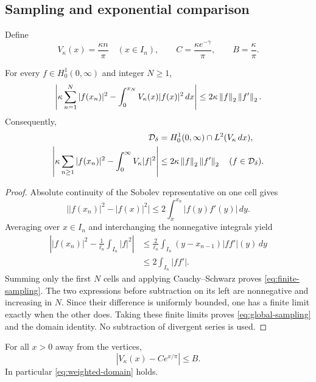 \subsection{Sampling and exponential comparison}

Define
\begin{equation}
V_\kappa(x)=\frac{\kappa n}{\pi}\quad (x\in I_n),
\qquad C=\frac{\kappa e^{-\gamma}}{\pi},
\qquad B=\frac{\kappa}{\pi}.
\label{eq:potential-def}
\end{equation}

\begin{lemma}
\label{lem:sampling}
For every $f\in H^1_0(0,\infty)$ and integer $N\ge1$,
\begin{equation}
\left|\kappa\sum_{n=1}^N|f(x_n)|^2
       -\int_0^{x_N}V_\kappa(x)|f(x)|^2\,dx\right|
\le2\kappa\left\lVert f\right\rVert_2\left\lVert f'\right\rVert_2.
\label{eq:finite-sampling}
\end{equation}
Consequently,
\begin{align}
\mathcal{D}_\delta&=H^1_0(0,\infty)\cap L^2(V_\kappa\,dx),\notag\\
\left|\kappa\sum_{n\ge1}|f(x_n)|^2
       -\int_0^\infty V_\kappa|f|^2\right|
&\le2\kappa\left\lVert f\right\rVert_2\left\lVert f'\right\rVert_2
\quad(f\in\mathcal{D}_\delta).
\label{eq:global-sampling}
\end{align}
\end{lemma}

\begin{proof}
Absolute continuity of the Sobolev representative on one cell gives
\[
\bigl||f(x_n)|^2-|f(x)|^2\bigr|
\le2\int_x^{x_n}|f(y)f'(y)|\,dy.
\]
Averaging over $x\in I_n$ and interchanging the nonnegative
integrals yield
\begin{align*}
\left||f(x_n)|^2-\frac1{\ell_n}\int_{I_n}|f|^2\right|
&\le\frac2{\ell_n}\int_{I_n}(y-x_{n-1})|ff'|(y)\,dy\\
&\le2\int_{I_n}|ff'|.
\end{align*}
Summing only the first $N$ cells and applying Cauchy--Schwarz
proves \eqref{eq:finite-sampling}.
The two expressions before subtraction on its left are nonnegative
and increasing in $N$. Since their difference is uniformly bounded,
one has a finite limit exactly when the other does.
Taking these finite limits proves \eqref{eq:global-sampling}
and the domain identity. No subtraction of divergent series is used.
\end{proof}

\begin{lemma}
\label{lem:harmonic}
For all $x>0$ away from the vertices,
\begin{equation}
|V_\kappa(x)-Ce^{x/\pi}|\le B.
\label{eq:exponential-error}
\end{equation}
In particular \eqref{eq:weighted-domain} holds.
\end{lemma}

